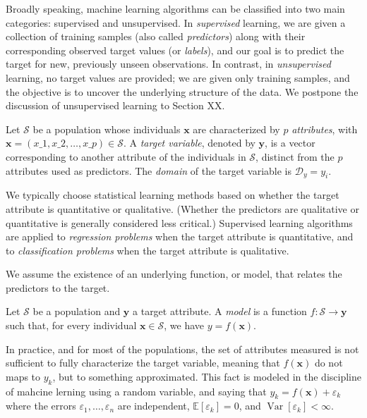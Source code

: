 Broadly speaking, machine learning algorithms can be classified into two main categories: supervised and unsupervised. In \emph{supervised} learning, we are given a collection of training samples (also called \emph{predictors}) along with their corresponding observed target values (or \emph{labels}), and our goal is to predict the target for new, previously unseen observations. In contrast, in \emph{unsupervised} learning, no target values are provided; we are given only training samples, and the objective is to uncover the underlying structure of the data. We postpone the discussion of unsupervised learning to {\color{red} Section XX}.

\begin{definition}
Let $\mathcal{S}$ be a population whose individuals $\mathbf{x}$ are characterized by $p$ \emph{attributes}, with $\mathbf{x} = (x\_{1}, x\_{2}, \dots, x\_{p}) \in \mathcal{S}$. A \emph{target variable}, denoted by $\mathbf{y}$, is a vector corresponding to another attribute of the individuals in $\mathcal{S}$, distinct from the $p$ attributes used as predictors. The \emph{domain} of the target variable is $\mathcal{D}_{y} = {y_{i}}$.
\end{definition}

We typically choose statistical learning methods based on whether the target attribute is quantitative or qualitative. (Whether the predictors are qualitative or quantitative is generally considered less critical.) Supervised learning algorithms are applied to \emph{regression problems} when the target attribute is quantitative, and to \emph{classification problems} when the target attribute is qualitative.

We assume the existence of an underlying function, or model, that relates the predictors to the target.

\begin{definition}
Let $\mathcal{S}$ be a population and $\mathbf{y}$ a target attribute. A \emph{model} is a function $f: \mathcal{S} \rightarrow \mathbf{y}$ such that, for every individual $\mathbf{x} \in \mathcal{S}$, we have $y = f(\mathbf{x})$.
\end{definition}

In practice, and for most of the populations, the set of attributes measured is not sufficient to fully characterize the target variable, meaning that $f(\mathbf{x})$ do not maps to $y_k$, but to something approximated. This fact is modeled in the discipline of mahcine lerning using a random variable, and saying that $y_k = f(\mathbf{x}) + \varepsilon_{k}$ where the errors $\varepsilon_{1},\dots,\varepsilon_{n}$ are independent, $\mathbb{E}[\varepsilon_{k}]=0$, and $\operatorname{Var}[\varepsilon_{k}]<\infty$.


